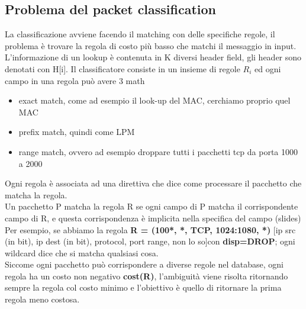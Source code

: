 \documentclass[12pt, oneside]{extbook} %
\begin{document}
\subsection{Problema del packet classification}
La classificazione avviene facendo il matching con delle specifiche regole, il problema è trovare la regola di costo più basso che matchi il messaggio in input.\\ L'informazione di un lookup è contenuta in K diversi header field, gli header sono denotati con H[i]. Il classificatore consiste in un insieme di regole $R_i$ ed ogni campo in una regola può avere 3 math
\begin{itemize}
\item exact match, come ad esempio il look-up del MAC, cerchiamo proprio quel MAC
\item prefix match, quindi come LPM
\item range match, ovvero ad esempio droppare tutti i pacchetti tcp da porta 1000 a 2000
\end{itemize}
Ogni regola è associata ad una direttiva che dice come processare il pacchetto che matcha la regola.\\ Un pacchetto P matcha la regola R se ogni campo di P matcha il corrispondente campo di R, e questa corrispondenza è implicita nella specifica del campo
(slides)\\ Per esempio, se abbiamo la regola \textbf{R = (100*, *, TCP, 1024:1080, *)} [ip src (in bit), ip dest (in bit), protocol, port range, non lo so]con \textbf{disp=DROP}; ogni wildcard dice che si matcha qualsiasi cosa.\\ Siccome ogni pacchetto può corrispondere a diverse regole nel database, ogni regola ha un costo non negativo \textbf{cost(R)}, l'ambiguità viene risolta ritornando sempre la regola col costo minimo e l'obiettivo è quello di ritornare la prima regola meno costosa.
\end{document}
